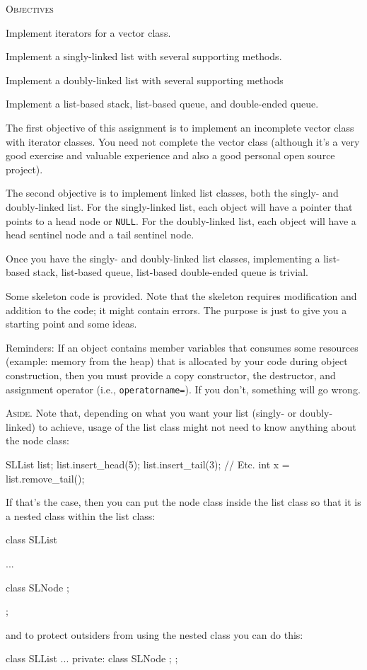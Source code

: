 \textsc{Objectives}
\begin{tightlist}
\item Implement iterators for a vector class.
\item Implement a singly-linked list with several supporting methods.
\item Implement a doubly-linked list with several supporting methods
\item Implement a list-based stack, list-based queue, and double-ended queue.
\end{tightlist}

The first objective of this assignment
is to implement an incomplete vector class with iterator classes.
You need not complete the vector class (although it's a very good
exercise and valuable experience and also a good personal open source
project).

The second objective is to implement linked list classes, both
the singly- and doubly-linked list.
For the singly-linked list, each object will have a pointer 
that points to a
head node or \verb!NULL!.
For the doubly-linked list, each object will have a 
head sentinel node and a tail sentinel node.

Once you have the singly- and doubly-linked list classes,
implementing a list-based stack,
list-based queue,
list-based double-ended queue is trivial.

Some skeleton code is provided.
Note that the skeleton requires modification and addition to the code;
it might contain errors.
The purpose is just to give you a starting point and  some ideas.

Reminders:
If an object contains member variables that consumes some resources
(example: memory from the heap)
that is allocated by your code during object construction, then
you must provide a copy constructor, the destructor, and
assignment operator (i.e., \verb!operatorname=!).
If you don't, something will go wrong.

\textsc{Aside.}
Note that, depending on what you want your 
list (singly- or doubly-linked) to achieve, usage of the list class
might not need to know anything about the node class:
\begin{console}[fontsize=\footnotesize]
SLList list;
list.insert_head(5);
list.insert_tail(3);
// Etc.
int x = list.remove_tail();
\end{console}
If that's the case, then you can put the node class inside the
list class so that it is a nested class within the list class:
\begin{console}[fontsize=\footnotesize]
class SLList
{
    ...

    class SLNode 
    {
    };
};
\end{console}
and to protect outsiders from using the nested class you can do this:
\begin{console}[fontsize=\footnotesize]
class SLList
{
    ...
private:
    class SLNode 
    {
    };
};
\end{console}
